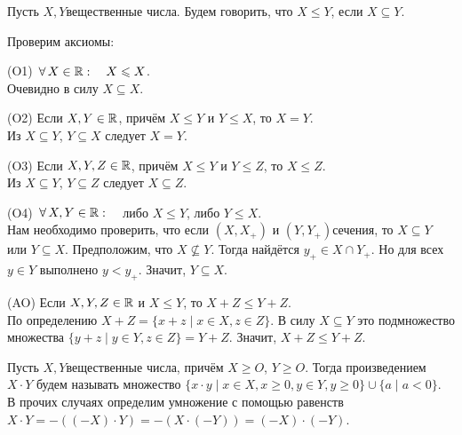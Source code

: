 \documentclass[a4paper,12pt]{article}
\begin{document}
Пусть $X,Y$\т вещественные числа. Будем говорить, что $X \le Y$, если $X \subseteq Y$.

Проверим аксиомы:
\begin{items}{-3}
\item[(O1)]
$\,\forall\, X\in \mathbb{R}:\quad X\leqslant X$.\\
Очевидно в силу $X\subseteq X$.
\item[(O2)]
Если $X,Y\in \mathbb{R}$, причём $X\le Y$ и $Y\le X$, то $X=Y$.\\
Из $X\subseteq Y$, $Y\subseteq X$ следует $X=Y$.
\item[(O3)]
Если  $X,Y,Z\in \mathbb{R}$, причём $X\le Y$ и $Y\le Z$, то $X\le Z$.\\
Из $X\subseteq Y$, $Y\subseteq Z$ следует $X\subseteq Z$.
\item[(O4)]
$\,\forall\, X,Y\in \mathbb{R}:\quad$ либо $X\le Y$, либо $Y\le X$.\\
Нам необходимо проверить, что если $(X, X_+)$ и $(Y, Y_+)$\т сечения, то $X\subseteq Y$ или $Y\subseteq X$. Предположим, что $X\not\subseteq Y$. Тогда найдётся $y_+ \in X \cap Y_+$. Но для всех $y\in Y$ выполнено $y < y_+$. Значит, $Y \subseteq X$.
\item[(AO)]
Если $X,Y,Z\in \mathbb{R}$ и $X\le Y$, то $X+Z\le Y+Z$.\\
По определению $X+Z = \{x+z \mid x\in X, z\in Z\}$. В силу $X\subseteq Y$ это подмножество множества $\{y+z \mid y\in Y, z\in Z\} = Y+Z$. Значит, $X+Z\le Y+Z$.
\end{items}

Пусть $X,Y$\т вещественные числа, причём $X \ge O$, $Y \ge O$. Тогда произведением $X \cdot Y$ будем называть множество $\{x \cdot y \mid x\in X, x \ge 0, y\in Y, y\ge 0\} \cup \{a \mid a<0\}$.\\
В прочих случаях определим умножение с помощью равенств $X\cdot Y = -((-X)\cdot Y) = -(X\cdot(-Y)) = (-X)\cdot(-Y)$.
\end{document}
